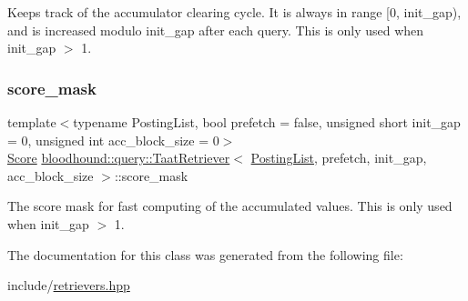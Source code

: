 Keeps track of the accumulator clearing cycle. It is always in range \mbox{[}0, init\+\_\+gap), and is increased modulo init\+\_\+gap after each query. This is only used when init\+\_\+gap $>$ 1. \mbox{\label{classbloodhound_1_1query_1_1TaatRetriever_ac38b873ceff34b55bb8ac82800946825}} 
\subsubsection{\texorpdfstring{score\+\_\+mask}{score\_mask}}
{\footnotesize\ttfamily template$<$typename Posting\+List, bool prefetch = false, unsigned short init\+\_\+gap = 0, unsigned int acc\+\_\+block\+\_\+size = 0$>$ \\
\hyperlink{structbloodhound_1_1Score}{Score} \hyperlink{classbloodhound_1_1query_1_1TaatRetriever}{bloodhound\+::query\+::\+Taat\+Retriever}$<$ \hyperlink{classbloodhound_1_1PostingList}{Posting\+List}, prefetch, init\+\_\+gap, acc\+\_\+block\+\_\+size $>$\+::score\+\_\+mask\hspace{0.3cm}{\ttfamily [protected]}}

The score mask for fast computing of the accumulated values. This is only used when init\+\_\+gap $>$ 1. 

The documentation for this class was generated from the following file\+:\begin{DoxyCompactItemize}
\item 
include/\hyperlink{retrievers_8hpp}{retrievers.\+hpp}\end{DoxyCompactItemize}
